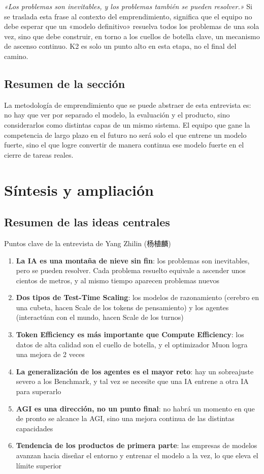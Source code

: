 \documentclass[a4paper]{article}
\begin{document}
\textit{«Los problemas son inevitables, y los problemas también se pueden resolver.»} Si se traslada esta frase al contexto del emprendimiento, significa que el equipo no debe esperar que un «modelo definitivo» resuelva todos los problemas de una sola vez, sino que debe construir, en torno a los cuellos de botella clave, un mecanismo de ascenso continuo. K2 es solo un punto alto en esta etapa, no el final del camino.

\subsection{Resumen de la sección}
La metodología de emprendimiento que se puede abstraer de esta entrevista es: no hay que ver por separado el modelo, la evaluación y el producto, sino considerarlos como distintas capas de un mismo sistema. El equipo que gane la competencia de largo plazo en el futuro no será solo el que entrene un modelo fuerte, sino el que logre convertir de manera continua ese modelo fuerte en el cierre de tareas reales.
\section{Síntesis y ampliación}

\subsection{Resumen de las ideas centrales}

\begin{importantbox}{Puntos clave de la entrevista de Yang Zhilin (杨植麟)}
\begin{enumerate}
    \item \textbf{La IA es una montaña de nieve sin fin}: los problemas son inevitables, pero se pueden resolver. Cada problema resuelto equivale a ascender unos cientos de metros, y al mismo tiempo aparecen problemas nuevos
    \item \textbf{Dos tipos de Test-Time Scaling}: los modelos de razonamiento (cerebro en una cubeta, hacen Scale de los tokens de pensamiento) y los agentes (interactúan con el mundo, hacen Scale de los turnos)
    \item \textbf{Token Efficiency es más importante que Compute Efficiency}: los datos de alta calidad son el cuello de botella, y el optimizador Muon logra una mejora de 2 veces
    \item \textbf{La generalización de los agentes es el mayor reto}: hay un sobreajuste severo a los Benchmark, y tal vez se necesite que una IA entrene a otra IA para superarlo
    \item \textbf{AGI es una dirección, no un punto final}: no habrá un momento en que de pronto se alcance la AGI, sino una mejora continua de las distintas capacidades
    \item \textbf{Tendencia de los productos de primera parte}: las empresas de modelos avanzan hacia diseñar el entorno y entrenar el modelo a la vez, lo que eleva el límite superior
\end{enumerate}
\end{importantbox}
\end{document}
